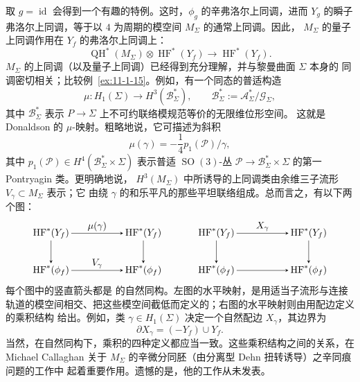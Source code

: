 \begin{remark}
取 $g=\operatorname{id}$ 会得到一个有趣的特例。这时，$\phi_g$ 的辛弗洛尔上同调，进而
$Y_g$ 的瞬子弗洛尔上同调，等于以 $4$ 为周期的模空间 $M_\Sigma$ 的通常上同调。因此，
$M_\Sigma$ 的量子上同调作用在 $Y_f$ 的弗洛尔上同调上：
\[
  \operatorname{QH}^*(M_\Sigma)\otimes\operatorname{HF}^*(Y_f)
  \longrightarrow\operatorname{HF}^*(Y_f).
\]
$M_\Sigma$ 的上同调（以及量子上同调）已经得到充分理解，并与黎曼曲面 $\Sigma$ 本身的
同调密切相关；比较例~\ref{ex:11-1-15}。例如，有一个同态的普适构造
\[
  \mu:H_1(\Sigma)\longrightarrow H^3(\mathcal B_\Sigma^*),
  \qquad
  \mathcal B_\Sigma^*:=\mathcal A_\Sigma^*/\mathcal G_\Sigma,
\]
其中 $\mathcal B_\Sigma^*$ 表示 $P\to\Sigma$ 上不可约联络模规范等价的无限维位形空间。
这就是 Donaldson 的 $\mu$-映射。粗略地说，它可描述为斜积
\[
  \mu(\gamma)=-\frac14p_1(\mathcal P)/\gamma,
\]
其中 $p_1(\mathcal P)\in H^4(\mathcal B_\Sigma^*\times\Sigma)$ 表示普适
$\operatorname{SO}(3)$-丛
$\mathcal P\to\mathcal B_\Sigma^*\times\Sigma$ 的第一 Pontryagin 类。更明确地说，
$H^3(M_\Sigma)$ 中所诱导的上同调类由余维三子流形 $V_\gamma\subset M_\Sigma$ 表示；它
由绕 $\gamma$ 的和乐平凡的那些平坦联络组成。总而言之，有以下两个图：
\[
\begin{tikzpicture}[baseline=(current bounding box.center),>=stealth,
  every node/.style={inner sep=2pt}]
  \node (a1) at (0,1.35) {$\operatorname{HF}^*(Y_f)$};
  \node (a2) at (3.35,1.35) {$\operatorname{HF}^*(Y_f)$};
  \node (a3) at (0,0) {$\operatorname{HF}^*(\phi_f)$};
  \node (a4) at (3.35,0) {$\operatorname{HF}^*(\phi_f)$};
  \draw[->] (a1) -- node[above] {$\mu(\gamma)$} (a2);
  \draw[->] (a3) -- node[above] {$V_\gamma$} (a4);
  \draw[->] (a1) -- (a3);
  \draw[->] (a2) -- (a4);
  \node (b1) at (6.0,1.35) {$\operatorname{HF}^*(Y_f)$};
  \node (b2) at (9.35,1.35) {$\operatorname{HF}^*(Y_f)$};
  \node (b3) at (6.0,0) {$\operatorname{HF}^*(\phi_f)$};
  \node (b4) at (9.35,0) {$\operatorname{HF}^*(\phi_f)$};
  \draw[->] (b1) -- node[above] {$X_\gamma$} (b2);
  \draw[->] (b3) -- (b4);
  \draw[->] (b1) -- (b3);
  \draw[->] (b2) -- (b4);
\end{tikzpicture}
\]
每个图中的竖直箭头都是  的自然同构。左图的水平映射，是用适当子流形与连接
轨道的模空间相交、把这些模空间截低而定义的；右图的水平映射则由用配边定义的乘积结构
给出。例如，类 $\gamma\in H_1(\Sigma)$ 决定一个自然配边 $X_\gamma$，其边界为
\[
  \partial X_\gamma=(-Y_f)\cup Y_f.
\]
当然，在自然同构下，乘积的四种定义都应当一致。这些乘积结构之间的关系，在 Michael
Callaghan 关于 $M_\Sigma$ 的辛微分同胚（由分离型 Dehn 扭转诱导）之辛同痕问题的工作中
起着重要作用。遗憾的是，他的工作从未发表。


\end{remark}
